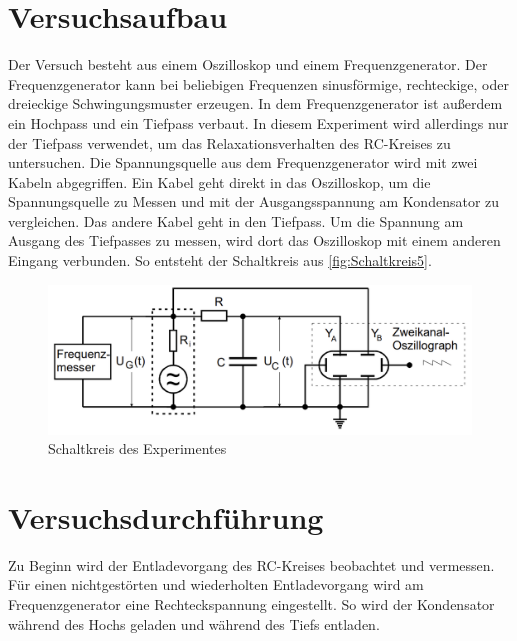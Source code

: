 


\section{Versuchsaufbau}
Der Versuch besteht aus einem Oszilloskop und einem Frequenzgenerator.
Der Frequenzgenerator kann bei beliebigen Frequenzen sinusförmige, rechteckige, oder dreieckige Schwingungsmuster erzeugen.
In dem Frequenzgenerator ist außerdem ein Hochpass und ein Tiefpass verbaut. In diesem Experiment wird allerdings nur der 
Tiefpass verwendet, um das Relaxationsverhalten des RC-Kreises zu untersuchen.
Die Spannungsquelle aus dem Frequenzgenerator wird mit zwei Kabeln abgegriffen. Ein Kabel geht direkt in das Oszilloskop, 
um die Spannungsquelle zu Messen und mit der Ausgangsspannung am Kondensator zu vergleichen.
Das andere Kabel geht in den Tiefpass. Um die Spannung am Ausgang des Tiefpasses zu messen, wird dort das Oszilloskop mit 
einem anderen Eingang verbunden. So entsteht der Schaltkreis aus \autoref{fig:Schaltkreis5}.

\begin{figure}[H]
    \includegraphics[width=\textwidth]{v353_Schaltkreise_5.png}
    \caption{Schaltkreis des Experimentes}
    \label{fig:Schaltkreis5}
\end{figure}


\section{Versuchsdurchführung}
Zu Beginn wird der Entladevorgang des RC-Kreises beobachtet und vermessen. Für einen nichtgestörten und wiederholten
Entladevorgang wird am Frequenzgenerator eine Rechteckspannung eingestellt. So wird der Kondensator während des Hochs 
geladen und während des Tiefs entladen.

